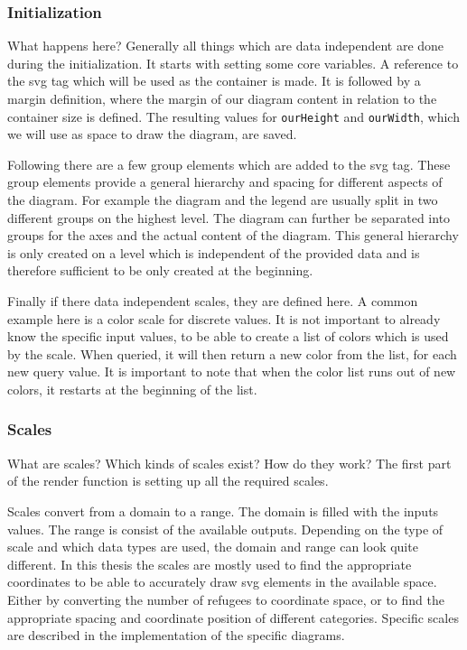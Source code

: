 \subsubsection{Initialization}
What happens here?
Generally all things which are data independent are done during the initialization. It starts with setting some core variables. A reference to the svg tag which will be used as the container is made. It is followed by a margin definition, where the margin of our diagram content in relation to the container size is defined. The resulting values for \verb|ourHeight| and \verb|ourWidth|, which we will use as space to draw the diagram, are saved. 

Following there are a few group elements which are added to the svg tag. These group elements provide a general hierarchy and spacing for different aspects of the diagram. For example the diagram and the legend are usually split in two different groups on the highest level. The diagram can further be separated into groups for the axes and the actual content of the diagram. This general hierarchy is only created on a level which is independent of the provided data and is therefore sufficient to be only created at the beginning.

Finally if there data independent scales, they are defined here. A common example here is a color scale for discrete values. It is not important to already know the specific input values, to be able to create a list of colors which is used by the scale. When queried, it will then return a new color from the list, for each new query value. It is important to note that when the color list runs out of new colors, it restarts at the beginning of the list.

\subsubsection{Scales}
What are scales? Which kinds of scales exist? How do they work?
The first part of the render function is setting up all the required scales. 

Scales convert from a domain to a range. The domain is filled with the inputs values. The range is consist of the available outputs. Depending on the type of scale and which data types are used, the domain and range can look quite different. In this thesis the scales are mostly used to find the appropriate coordinates to be able to accurately draw svg elements in the available space. Either by converting the number of refugees to coordinate space, or to find the appropriate spacing and coordinate position of different categories. Specific scales are described in the implementation of the specific diagrams.

